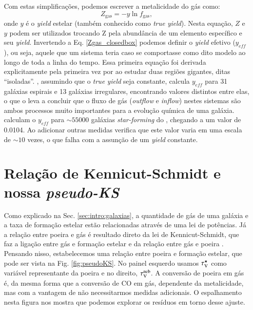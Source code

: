 Com estas simplificações, podemos escrever a metalicidade do gás como:
\begin{equation}
	Z_{\mathrm{gas}} = - y \ln f_{\mathrm{gas}},
	\label{eq:Zgas_closedbox}
\end{equation}
\noindent onde $y$ é o {\em yield} estelar (também conhecido como {\em true yield}). Nesta equação,
$Z$ e $y$ podem ser utilizados trocando Z pela abundância de um elemento específico e seu {\em
yield}. Invertendo a Eq. \ref{Zgas_closedbox} podemos definir o {\em yield} efetivo ($y_{eff}$), ou
seja, aquele que um sistema teria caso se comportasse como dito modelo ao longo de toda a linha do tempo. Essa
primeira equação foi derivada explicitamente pela primeira vez por \citet{Searle.Sargent.1972a} ao
estudar duas regiões \Hii gigantes, ditas ``isoladas''. \citet{Garnett.2002a}, assumindo que o {\em
true yield} seja constante, calcula $y_{eff}$ para 31 galáxias espirais e 13 galáxias irregulares,
encontrando valores distintos entre elas, o que o leva a concluir que o fluxo de gás ({\em outflow}
e {\em inflow}) nestes sistemas são ambos processos muito importantes para a evolução química de uma
galáxia. \citet{Tremonti.etal.2004a} calculam o $y_{eff}$ para $\sim 55000$ galáxias {\em
star-forming} do \SDSS, chegando a um valor de 0.0104. Ao adicionar outras medidas verifica que este
valor varia em uma escala de $\sim 10$ vezes, o que falha com a assunção de um {\em yield}
constante.

\section{Relação de Kennicut-Schmidt e nossa {\em pseudo-KS}}
\label{sec:gasfrac:KS}

Como explicado na Sec. \ref{sec:intro:galaxias}, a quantidade de gás de uma galáxia e a taxa de
formação estelar estão relacionadas através de uma lei de potências. Já a relação entre poeira e gás
é resultado direto da lei de Kennicut-Schmidt, que faz a ligação entre gás e formação estelar e da
relação entre gás e poeira \citep[][e suas referências]{Magdis.etal.2011a, Leroy.etal.2011a,
Santini.etal.2014a}. Pensando nisso, estabelecemos uma relação entre poeira e formação estelar, que
pode ser vista na Fig. \ref{fig:pseudoKS}. No painel esquerdo usamos $\tau_{\mathrm{V}}^\star$ como variável
representante da poeira e no direito, $\tau_{\mathrm{V}}^{\mathrm{neb}}$. A conversão de poeira em gás é, da mesma forma que a
conversão de CO em gás, dependente da metalicidade, mas com a vantagem de não necessitarmos
medidas adicionais. O espalhamento nesta figura nos mostra que podemos explorar os resíduos em torno
desse ajuste.

